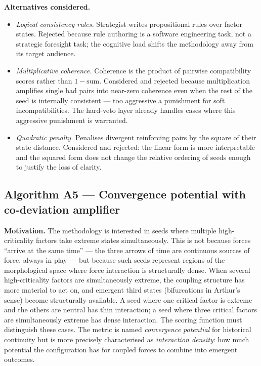 \documentclass[11pt,a4paper]{article}
\begin{document}
\textbf{Alternatives considered.}

\begin{itemize}[leftmargin=*]
  \item \emph{Logical consistency rules.} Strategist writes propositional rules over factor states. Rejected because rule authoring is a software engineering task, not a strategic foresight task; the cognitive load shifts the methodology away from its target audience.
  \item \emph{Multiplicative coherence.} Coherence is the product of pairwise compatibility scores rather than $1 - \text{sum}$. Considered and rejected because multiplication amplifies single bad pairs into near-zero coherence even when the rest of the seed is internally consistent — too aggressive a punishment for soft incompatibilities. The hard-veto layer already handles cases where this aggressive punishment is warranted.
  \item \emph{Quadratic penalty.} Penalises divergent reinforcing pairs by the square of their state distance. Considered and rejected: the linear form is more interpretable and the squared form does not change the relative ordering of seeds enough to justify the loss of clarity.
\end{itemize}

\subsection{Algorithm A5 — Convergence potential with co-deviation amplifier}

\textbf{Motivation.} The methodology is interested in seeds where multiple high-criticality factors take extreme states simultaneously. This is not because forces ``arrive at the same time'' — the three arrows of time are continuous sources of force, always in play — but because such seeds represent regions of the morphological space where force interaction is structurally dense. When several high-criticality factors are simultaneously extreme, the coupling structure has more material to act on, and emergent third states (bifurcations in Arthur's sense) become structurally available. A seed where one critical factor is extreme and the others are neutral has thin interaction; a seed where three critical factors are simultaneously extreme has dense interaction. The scoring function must distinguish these cases. The metric is named \emph{convergence potential} for historical continuity but is more precisely characterised as \emph{interaction density}: how much potential the configuration has for coupled forces to combine into emergent outcomes.
\end{document}
